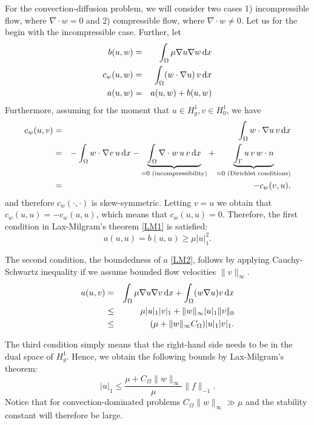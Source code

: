For the convection-diffusion problem, we will consider two cases 1) incompressible flow, where
$\nabla \cdot w = 0 $ and 2) compressible flow, where $\nabla \cdot w \not = 0 $.  
Let us for the begin with the incompressible case.  
Further, let 
\begin{eqnarray*}
b(u,w) &=& \int_\Omega\mu\nabla u\nabla w \, \mathrm{d}x\\
	c_w(u,w) &=& \int_\Omega (w \cdot \nabla u) \,v \, \mathrm{d}x\\
a(u,w) &=& a(u,w) + b(u,w)\\
\end{eqnarray*}
Furthermore, assuming for the moment that $u \in H^1_g, v\in H^1_0$, we have  
\begin{eqnarray*}
c_w(u,v) &=& \int_\Omega w\cdot \nabla u\, v \, \mathrm{d}x  \\ 
         &=&-\int_\Omega w\cdot \nabla v \, u \, \mathrm{d}x 
- \underbrace{\int_\Omega \nabla \cdot w \, u \, v \, \mathrm{d}x}_{= 0 \textrm{ (incompressibility)}} 
+ \underbrace{\int_\Gamma u \, v \, w \cdot n}_{ = 0  \textrm{ (Dirichlet conditions)}} \\       
         &=& - c_w(v,u) . 
\end{eqnarray*}
and therefore $c_w(\cdot, \cdot)$ is skew-symmetric. Letting $v=u$ we obtain that   
$c_w(u,u) = -c_w(u,u)$, which means that $c_w(u,u)=0$. 
Therefore, the first condition in Lax-Milgram's theorem \eqref{LM1} is satisfied:   
\[  
a(u,u) = b(u,u) \ge \mu |u|_1^2 .  
\]

The second condition, the boundedness of $a$ \eqref{LM2}, follows by applying Cauchy-Schwartz inequality
if we assume bounded flow velocities $\|v\|_{\infty}$.  
\begin{eqnarray*}
	a(u,v) &=& \int_\Omega\mu\nabla u\nabla v \, \mathrm{d}x + \int_\Omega (w\nabla u) v \, \mathrm{d}x\\
       &\le& \mu |u|_1 |v|_1  + \|w\|_{\infty} |u|_1 \|v\|_0 \\   
       &\le& (\mu + \|w\|_{\infty} C_\Omega )  |u|_1 |v|_1 .    
\end{eqnarray*}

The third condition simply means that the right-hand side needs to be in the dual 
space of $H^1_g$. Hence, we obtain the following bounds by Lax-Milgram's theorem:   
\[
|u|_1 \le \frac{ \mu + C_\Omega \|w\|_{\infty}}{\mu} \|f\|_{-1} . 
\]
Notice that for convection-dominated problems $ C_\Omega \|w\|_{\infty} \gg \mu$ 
and the stability constant will therefore be large. 

